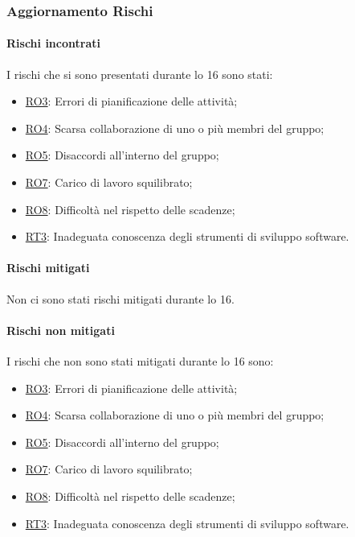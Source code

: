 \subsubsection{Aggiornamento Rischi}
\label{sec:aggiornamento_rischi_sprint16}

\paragraph{Rischi incontrati}
\label{par:rischi_incontrati_sprint16}
I rischi che si sono presentati durante lo  16 sono stati:
\begin{itemize}
    \item \hyperref[rischio:RO3]{RO3}: Errori di pianificazione delle attività;
    \item \hyperref[rischio:RO3]{RO4}: Scarsa collaborazione di uno o più membri del gruppo;
    \item \hyperref[rischio:RO3]{RO5}: Disaccordi all'interno del gruppo;
    \item \hyperref[rischio:RO3]{RO7}: Carico di lavoro squilibrato;
    \item \hyperref[rischio:RO3]{RO8}: Difficoltà nel rispetto delle scadenze;
    \item \hyperref[rischio:RT3]{RT3}: Inadeguata conoscenza degli strumenti di sviluppo software.
\end{itemize}

\paragraph{Rischi mitigati}
\label{par:rischi_mitigati_sprint16}
Non ci sono stati rischi mitigati durante lo  16.

\paragraph{Rischi non mitigati}
\label{par:rischi_non_mitigati_sprint16}
I rischi che non sono stati mitigati durante lo  16 sono:
\begin{itemize}
    \item \hyperref[rischio:RO3]{RO3}: Errori di pianificazione delle attività;
    \item \hyperref[rischio:RO3]{RO4}: Scarsa collaborazione di uno o più membri del gruppo;
    \item \hyperref[rischio:RO3]{RO5}: Disaccordi all'interno del gruppo;
    \item \hyperref[rischio:RO3]{RO7}: Carico di lavoro squilibrato;
    \item \hyperref[rischio:RO3]{RO8}: Difficoltà nel rispetto delle scadenze;
    \item \hyperref[rischio:RT3]{RT3}: Inadeguata conoscenza degli strumenti di sviluppo software.
\end{itemize}